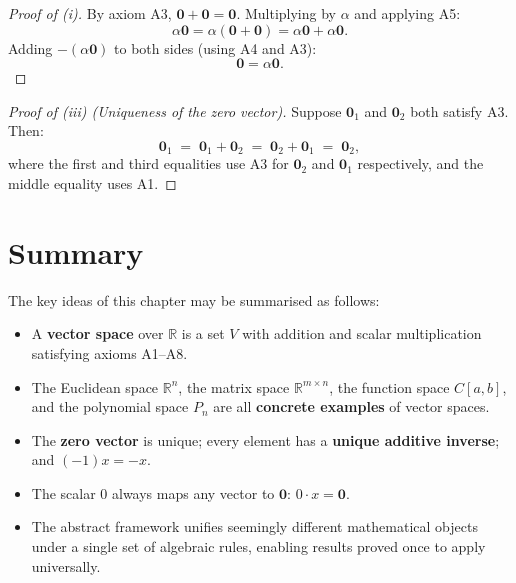 \documentclass[12pt]{article}
\newcommand{\R}{\mathbb{R}}
\newcommand{\vzero}{\mathbf{0}}
\begin{document}
	\begin{proof}[Proof of (i)]
		By axiom A3, $\vzero + \vzero = \vzero$.  Multiplying by $\alpha$ and applying
		A5:
		\[
		\alpha\vzero = \alpha(\vzero + \vzero) = \alpha\vzero + \alpha\vzero.
		\]
		Adding $-(\alpha\vzero)$ to both sides (using A4 and A3):
		\[
		\vzero = \alpha\vzero.
		\]
	\end{proof}
	
	\begin{proof}[Proof of (iii) (Uniqueness of the zero vector)]
		Suppose $\vzero_1$ and $\vzero_2$ both satisfy A3.  Then:
		\[
		\vzero_1 \;=\; \vzero_1 + \vzero_2 \;=\; \vzero_2 + \vzero_1 \;=\; \vzero_2,
		\]
		where the first and third equalities use A3 for $\vzero_2$ and $\vzero_1$
		respectively, and the middle equality uses A1.
	\end{proof}
	
	
	\section{Summary}

	
	The key ideas of this chapter may be summarised as follows:
	
	\begin{tcolorbox}[
		enhanced, colback=shadeyellow, colframe=orange!70!black,
		title={\bfseries Chapter Summary}, fonttitle=\bfseries, breakable
		]
		\begin{itemize}[leftmargin=1.5em, itemsep=0.5em]
			\item A \textbf{vector space} over $\R$ is a set $V$ with addition and scalar
			multiplication satisfying axioms A1--A8.
			\item The Euclidean space $\R^n$, the matrix space $\R^{m\times n}$, the
			function space $C[a,b]$, and the polynomial space $P_n$ are all
			\textbf{concrete examples} of vector spaces.
			\item The \textbf{zero vector} is unique; every element has a \textbf{unique
				additive inverse}; and $(-1)x = -x$.
			\item The scalar $0$ always maps any vector to $\vzero$:
			$0\cdot x = \vzero$.
			\item The abstract framework unifies seemingly different mathematical objects
			under a single set of algebraic rules, enabling results proved once to
			apply universally.
		\end{itemize}
	\end{tcolorbox}
	
	
\end{document}
